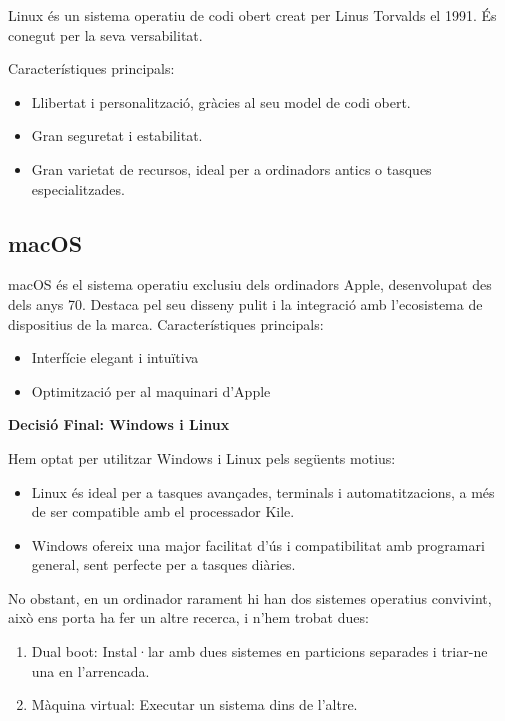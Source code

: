 \label{subsec:Linux}
Linux és un sistema operatiu de codi obert creat per Linus Torvalds el 1991. És conegut per la seva versabilitat.

Característiques principals:
\begin{itemize}
 \item Llibertat i personalització, gràcies al seu model de codi obert.
 \item Gran seguretat i estabilitat.
 \item Gran varietat de  recursos, ideal per a ordinadors antics o tasques especialitzades.
\end{itemize}


\subsection{macOS}

\label{subsec:Mac OS}
macOS és el sistema operatiu exclusiu dels ordinadors Apple, desenvolupat des dels anys 70. Destaca pel seu disseny pulit i la integració amb l'ecosistema de dispositius de la marca.
Característiques principals:
\begin{itemize}
 \item Interfície elegant i intuïtiva
 \item Optimització per al maquinari d'Apple
\end{itemize}

\textbf{Decisió Final: Windows i Linux}

Hem optat per utilitzar Windows i Linux pels següents motius:
\begin{itemize}
\item Linux és ideal per a tasques avançades, terminals i automatitzacions, a més de ser compatible amb el processador Kile.

\item Windows ofereix una major facilitat d'ús i compatibilitat amb programari general, sent perfecte per a tasques diàries.
\end{itemize}

No obstant, en un ordinador rarament hi han dos sistemes operatius convivint, això ens porta ha fer un altre recerca, i n'hem trobat dues:
\begin{enumerate}
 \item Dual boot: Instal·lar amb dues sistemes en particions separades i triar-ne una en l’arrencada.
 \item Màquina virtual: Executar un sistema dins de l’altre.
\end{enumerate}

